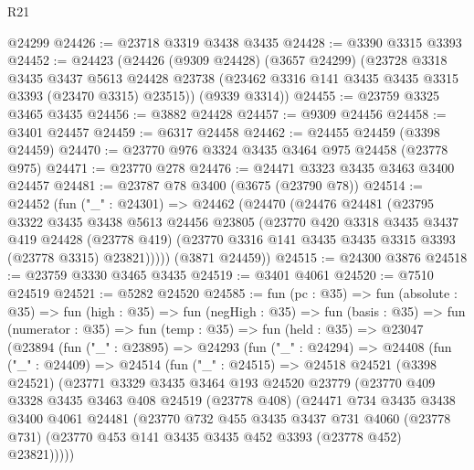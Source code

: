 \begin{lexlean}{R21}
\begin{coremodule}
    @24299
@24426 := @23718 @3319 @3438 @3435
@24428 := @3390 @3315 @3393
@24452 := @24423
    (@24426
      (@9309 @24428)
      (@3657 @24299)
      (@23728
        @3318
        @3435
        @3437
        @5613
        @24428
        @23738
        (@23462 @3316 @141 @3435 @3435 @3315 @3393 (@23470 @3315) @23515))
      (@9339 @3314))
@24455 := @23759 @3325 @3465 @3435
@24456 := @3882 @24428
@24457 := @9309 @24456
@24458 := @3401 @24457
@24459 := @6317 @24458
@24462 := @24455 @24459 (@3398 @24459)
@24470 := @23770 @976 @3324 @3435 @3464 @975 @24458 (@23778 @975)
@24471 := @23770 @278
@24476 := @24471 @3323 @3435 @3463 @3400 @24457
@24481 := @23787 @78 @3400 (@3675 (@23790 @78))
@24514 := @24452
    (fun ("_" : @24301) =>
    @24462
      (@24470
        (@24476
          @24481
          (@23795
            @3322
            @3435
            @3438
            @5613
            @24456
            @23805
            (@23770
              @420
              @3318
              @3435
              @3437
              @419
              @24428
              (@23778 @419)
              (@23770 @3316 @141 @3435 @3435 @3315 @3393 (@23778 @3315) @23821)))))
      (@3871 @24459))
@24515 := @24300 @3876
@24518 := @23759 @3330 @3465 @3435
@24519 := @3401 @4061
@24520 := @7510 @24519
@24521 := @5282 @24520
@24585 := fun (pc : @35) =>
  fun (absolute : @35) =>
  fun (high : @35) =>
  fun (negHigh : @35) =>
  fun (basis : @35) =>
  fun (numerator : @35) =>
  fun (temp : @35) =>
  fun (held : @35) =>
  @23047
    (@23894
      (fun ("_" : @23895) =>
      @24293
        (fun ("_" : @24294) =>
        @24408
          (fun ("_" : @24409) =>
          @24514
            (fun ("_" : @24515) =>
            @24518
              @24521
              (@3398 @24521)
              (@23771
                @3329
                @3435
                @3464
                @193
                @24520
                @23779
                (@23770
                  @409
                  @3328
                  @3435
                  @3463
                  @408
                  @24519
                  (@23778 @408)
                  (@24471
                    @734
                    @3435
                    @3438
                    @3400
                    @4061
                    @24481
                    (@23770
                      @732
                      @455
                      @3435
                      @3437
                      @731
                      @4060
                      (@23778 @731)
                      (@23770 @453 @141 @3435 @3435 @452 @3393 (@23778 @452) @23821)))))

\end{coremodule}
\end{lexlean}
